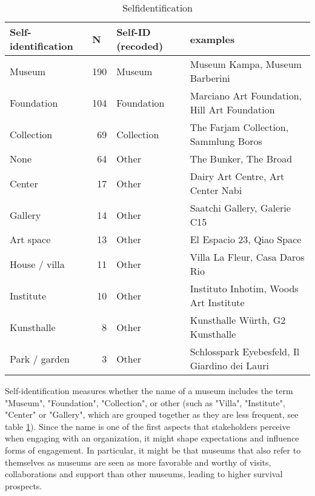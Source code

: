 \documentclass[12pt]{article}
\begin{document}
\begin{table}[ht]
\centering
\begin{tabular}{lrll}
  \hline 
 \multicolumn{1}{l}{Self-identification} & \multicolumn{1}{l}{N} & \multicolumn{1}{l}{Self-ID (recoded)} & \multicolumn{1}{l}{examples}\\ 
 \hline
 Museum & 190 & Museum & Museum Kampa, Museum Barberini \\ 
  Foundation & 104 & Foundation & Marciano Art Foundation, Hill Art Foundation \\ 
  Collection &  69 & Collection & The Farjam Collection, Sammlung Boros \\ 
  None &  64 & Other & The Bunker, The Broad \\ 
  Center &  17 & Other & Dairy Art Centre, Art Center Nabi \\ 
  Gallery &  14 & Other & Saatchi Gallery, Galerie C15 \\ 
  Art space &  13 & Other & El Espacio 23, Qiao Space \\ 
  House / villa &  11 & Other & Villa La Fleur, Casa Daros Rio \\ 
  Institute &  10 & Other & Instituto Inhotim, Woods Art Institute \\ 
  Kunsthalle &   8 & Other & Kunsthalle Würth, G2 Kunsthalle \\ 
  Park / garden &   3 & Other & Schlosspark Eyebesfeld, Il Giardino dei Lauri \\ 
   \hline
\end{tabular}
\caption{Selfidentification} 
\label{tbl:t_selfid}
\end{table}

Self-identification measures whether the name of a museum includes the term "Museum", "Foundation", "Collection", or other (such as "Villa", "Institute", "Center" or "Gallery", which are grouped together as they are less frequent, see table \ref{tbl:t_selfid}).
Since the name is one of the first aspects that stakeholders perceive when engaging with an organization, it might shape expectations and influence forms of engagement.
In particular, it might be that museums that also refer to themselves as museums are seen as more favorable and worthy of visits, collaborations and support than other museums, leading to higher survival prospects.
\end{document}
